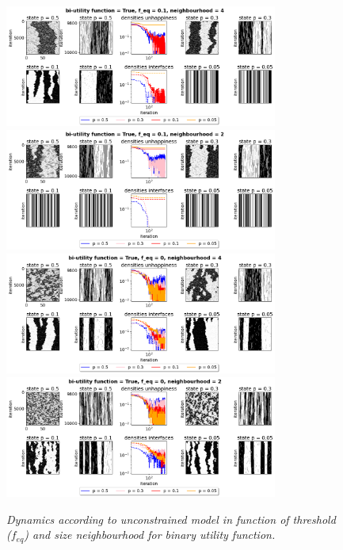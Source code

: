 \begin{figure}[H]
\begin{center}
	\includegraphics[width=0.8\textwidth]{dyn5.png}
	\includegraphics[width=0.8\textwidth]{dyn6.png}
	\includegraphics[width=0.8\textwidth]{dyn7.png}
	\includegraphics[width=0.8\textwidth]{dyn8.png}
 
	\caption{\emph{ Dynamics according to unconstrained model in function of threshold ($f_{eq}$) and size neighbourhood for  binary utility function. }}
	\label{figuur4}
\end{center}
\end{figure}

\newpage